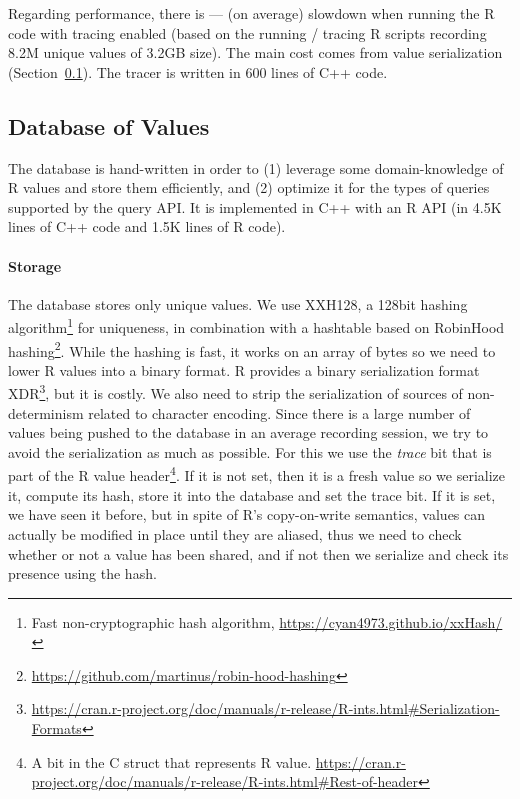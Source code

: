 \documentclass[sigplan,anonymous,review]{acmart}
\begin{document}
Regarding performance, there is \TRMinTracingOverhead --- \TRMaxTracingOverhead (\TRAvgTracingOverhead on average) slowdown when running the R code with tracing enabled (based on the running / tracing \TRTracingFiles R scripts recording 8.2M unique values of 3.2GB size).
The main cost comes from value serialization (\Cf Section~\ref{sec:sxpdb}).
The tracer is written in 600 lines of C++ code.

\subsection{Database of Values}\label{sec:sxpdb}

The database is hand-written in order to (1) leverage some domain-knowledge of R values and store them efficiently, and (2) optimize it for the types of queries supported by the query API.
It is implemented in C++ with an R API (in 4.5K lines of C++ code and 1.5K lines of R code).

\paragraph{Storage}

The database stores only unique values.
We use XXH128, a 128bit hashing algorithm\footnote{Fast non-cryptographic hash algorithm, \Cf \url{https://cyan4973.github.io/xxHash/}} for uniqueness, in combination with a hashtable based on RobinHood hashing\footnote{\url{https://github.com/martinus/robin-hood-hashing}}.
While the hashing is fast, it works on an array of bytes so we need to lower R values into a binary format.
R provides a binary serialization format XDR\footnote{\Cf \url{https://cran.r-project.org/doc/manuals/r-release/R-ints.html\#Serialization-Formats}}, but it is costly. We also need to strip the serialization of sources of non-determinism related to character encoding.
Since there is a large number of values being pushed to the database in an average recording session, we try to avoid the serialization as much as possible.
For this we use the \emph{trace} bit that is part of the R value header\footnote{A bit in the  C struct that represents R value. \Cf \url{https://cran.r-project.org/doc/manuals/r-release/R-ints.html\#Rest-of-header}}.
If it is not set, then it is a fresh value so we serialize it, compute its hash, store it into the database and set the trace bit.
If it is set, we have seen it before, but in spite of R's copy-on-write semantics, values can actually be modified in place until they are aliased, thus we need to check whether or not a value has been shared, and if not then we serialize and check its presence using the hash.
\end{document}
